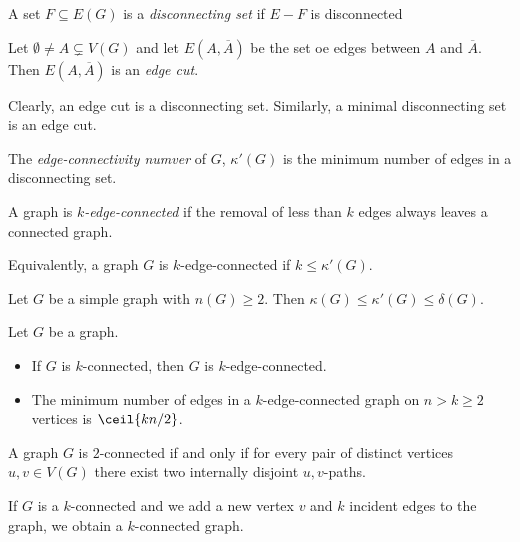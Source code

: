 \begin{definition}
    A set $F \subseteq E(G)$ is a \emph{disconnecting set}
    if $E - F$ is disconnected
\end{definition}

\begin{definition}
    Let $\emptyset \neq A \subsetneq V(G)$ and let $E(A, \overline{A})$ be 
    the set oe edges between $A$ and $\overline{A}$. Then 
    $E(A, \overline{A})$ is an \emph{edge cut}.
\end{definition}

Clearly, an edge cut is a disconnecting set. Similarly, 
a minimal disconnecting set is an edge cut.

\begin{definition}
    The \emph{edge-connectivity numver} of $G$, 
    $\kappa'(G)$ is the minimum number of edges in a 
    disconnecting set.
\end{definition}

\begin{definition}
    A graph is \emph{$k$-edge-connected}
    if the removal of less than $k$ edges always leaves a connected graph.
\end{definition}

Equivalently, a graph $G$ is $k$-edge-connected if $k \le \kappa'(G)$.

\begin{theorem}
    Let $G$ be a simple graph with $n(G) \ge 2$. Then 
    $\kappa(G) \le \kappa'(G) \le \delta(G)$.
\end{theorem}


\begin{corollary} Let $G$ be a graph.
    \begin{itemize}
        \item If $G$ is $k$-connected, then $G$ is 
        $k$-edge-connected.
        \item The minimum number of edges in a $k$-edge-connected
        graph on $n > k \ge 2$ vertices is $\ceil{kn/2}$.
    \end{itemize}
\end{corollary}


\begin{theorem}[Whitney] 
    A graph $G$ is $2$-connected if and only if for every 
    pair of distinct vertices $u,v \in V(G)$ there 
    exist two internally disjoint $u,v$-paths.
\end{theorem}

\begin{lemma}[Expansion]
    If $G$ is a $k$-connected and we add a new vertex $v$ 
    and $k$ incident edges to the graph, we obtain a 
    $k$-connected graph.
\end{lemma}

